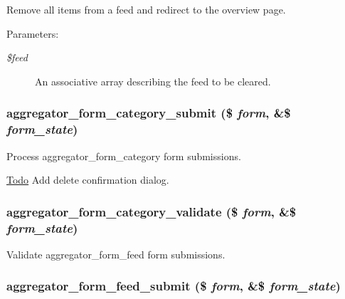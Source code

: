 Remove all items from a feed and redirect to the overview page.

\begin{Desc}
\item[Parameters:]
\begin{description}
\item[{\em \$feed}]An associative array describing the feed to be cleared. \end{description}
\end{Desc}
\hypertarget{aggregator_8admin_8inc_56c1cadf416d17bd8dd8a53cc6ed5aeb}{
\subsubsection[{aggregator\_\-form\_\-category\_\-submit}]{\setlength{\rightskip}{0pt plus 5cm}aggregator\_\-form\_\-category\_\-submit (\$ {\em form}, \/  \&\$ {\em form\_\-state})}}
\label{aggregator_8admin_8inc_56c1cadf416d17bd8dd8a53cc6ed5aeb}


Process aggregator\_\-form\_\-category form submissions.

\begin{Desc}
\item[\hyperlink{todo__todo000002}{Todo}]Add delete confirmation dialog. \end{Desc}
\hypertarget{aggregator_8admin_8inc_419c55e35895dea1f41d5b31908883d5}{
\subsubsection[{aggregator\_\-form\_\-category\_\-validate}]{\setlength{\rightskip}{0pt plus 5cm}aggregator\_\-form\_\-category\_\-validate (\$ {\em form}, \/  \&\$ {\em form\_\-state})}}
\label{aggregator_8admin_8inc_419c55e35895dea1f41d5b31908883d5}


Validate aggregator\_\-form\_\-feed form submissions. \hypertarget{aggregator_8admin_8inc_f98f428f07034e19622342875fe30984}{
\subsubsection[{aggregator\_\-form\_\-feed\_\-submit}]{\setlength{\rightskip}{0pt plus 5cm}aggregator\_\-form\_\-feed\_\-submit (\$ {\em form}, \/  \&\$ {\em form\_\-state})}}
\label{aggregator_8admin_8inc_f98f428f07034e19622342875fe30984}


